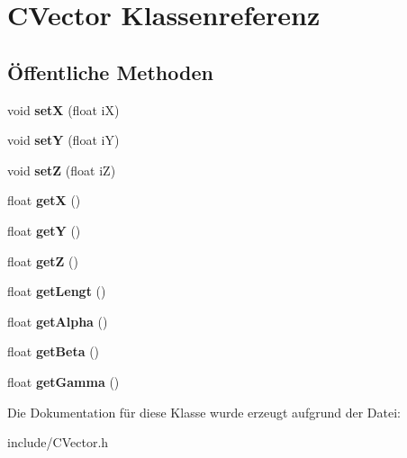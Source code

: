 \hypertarget{class_c_vector}{\section{\-C\-Vector \-Klassenreferenz}
\label{class_c_vector}
}
\subsection*{Öffentliche \-Methoden}
\begin{DoxyCompactItemize}
\item 
\hypertarget{class_c_vector_a78ea7bd623cad487398655435a03fca6}{void {\bfseries set\-X} (float i\-X)}\label{class_c_vector_a78ea7bd623cad487398655435a03fca6}

\item 
\hypertarget{class_c_vector_af126cf4ef28a51c462ffe344acb192b3}{void {\bfseries set\-Y} (float i\-Y)}\label{class_c_vector_af126cf4ef28a51c462ffe344acb192b3}

\item 
\hypertarget{class_c_vector_a1f4aa39ed74c65592e0226d36b2b4454}{void {\bfseries set\-Z} (float i\-Z)}\label{class_c_vector_a1f4aa39ed74c65592e0226d36b2b4454}

\item 
\hypertarget{class_c_vector_aac8833bd92ed3c705133a64ce93e00ff}{float {\bfseries get\-X} ()}\label{class_c_vector_aac8833bd92ed3c705133a64ce93e00ff}

\item 
\hypertarget{class_c_vector_a48684f5bbfa35c36b8d89279b738c7b0}{float {\bfseries get\-Y} ()}\label{class_c_vector_a48684f5bbfa35c36b8d89279b738c7b0}

\item 
\hypertarget{class_c_vector_a9d41a1f967fbc60c2dae2c8b6534c8c4}{float {\bfseries get\-Z} ()}\label{class_c_vector_a9d41a1f967fbc60c2dae2c8b6534c8c4}

\item 
\hypertarget{class_c_vector_a6f2f665520c67347e95a3ddf1393c3cd}{float {\bfseries get\-Lengt} ()}\label{class_c_vector_a6f2f665520c67347e95a3ddf1393c3cd}

\item 
\hypertarget{class_c_vector_a8a63aaf774089c3ba0033e8a4ed960c9}{float {\bfseries get\-Alpha} ()}\label{class_c_vector_a8a63aaf774089c3ba0033e8a4ed960c9}

\item 
\hypertarget{class_c_vector_aa49bd1ec82f99cf57634a247a240cb8e}{float {\bfseries get\-Beta} ()}\label{class_c_vector_aa49bd1ec82f99cf57634a247a240cb8e}

\item 
\hypertarget{class_c_vector_adca3da06ca39765a46ee390412ac8d6c}{float {\bfseries get\-Gamma} ()}\label{class_c_vector_adca3da06ca39765a46ee390412ac8d6c}

\end{DoxyCompactItemize}


\-Die \-Dokumentation für diese \-Klasse wurde erzeugt aufgrund der \-Datei\-:\begin{DoxyCompactItemize}
\item 
include/\-C\-Vector.\-h\end{DoxyCompactItemize}
